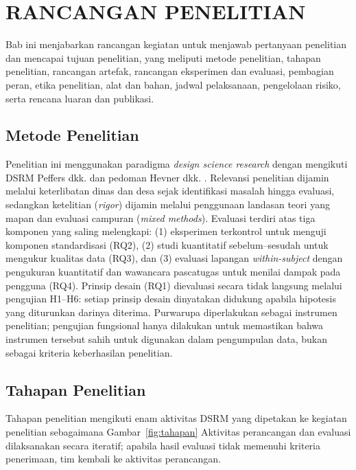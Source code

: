 \documentclass[12pt,a4paper]{report}
\begin{document}
\chapter{RANCANGAN PENELITIAN}
\label{chap:rancangan}

Bab ini menjabarkan rancangan kegiatan untuk menjawab pertanyaan penelitian dan mencapai tujuan penelitian, yang meliputi metode penelitian, tahapan penelitian, rancangan artefak, rancangan eksperimen dan evaluasi, pembagian peran, etika penelitian, alat dan bahan, jadwal pelaksanaan, pengelolaan risiko, serta rencana luaran dan publikasi.

\section{Metode Penelitian}
\label{sec:metode}

Penelitian ini menggunakan paradigma \textit{design science research} dengan mengikuti DSRM Peffers dkk. \cite{peffers2007dsrm} dan pedoman Hevner dkk. \cite{hevner2004design}. Relevansi penelitian dijamin melalui keterlibatan dinas dan desa sejak identifikasi masalah hingga evaluasi, sedangkan ketelitian (\textit{rigor}) dijamin melalui penggunaan landasan teori yang mapan dan evaluasi campuran (\textit{mixed methods}). Evaluasi terdiri atas tiga komponen yang saling melengkapi: (1) eksperimen terkontrol untuk menguji komponen standardisasi (RQ2), (2) studi kuantitatif sebelum--sesudah untuk mengukur kualitas data (RQ3), dan (3) evaluasi lapangan \textit{within-subject} dengan pengukuran kuantitatif dan wawancara pascatugas untuk menilai dampak pada pengguna (RQ4). Prinsip desain (RQ1) dievaluasi secara tidak langsung melalui pengujian H1--H6: setiap prinsip desain dinyatakan didukung apabila hipotesis yang diturunkan darinya diterima. Purwarupa diperlakukan sebagai instrumen penelitian; pengujian fungsional hanya dilakukan untuk memastikan bahwa instrumen tersebut sahih untuk digunakan dalam pengumpulan data, bukan sebagai kriteria keberhasilan penelitian.

\section{Tahapan Penelitian}
\label{sec:tahapan}

Tahapan penelitian mengikuti enam aktivitas DSRM yang dipetakan ke kegiatan penelitian sebagaimana Gambar~\ref{fig:tahapan} Aktivitas perancangan dan evaluasi dilaksanakan secara iteratif; apabila hasil evaluasi tidak memenuhi kriteria penerimaan, tim kembali ke aktivitas perancangan.
\end{document}
